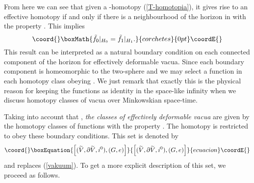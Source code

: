 \documentclass[a4paper,12pt,draft]{article}
\begin{document}
From here we can see that given a \coordHE{}-homotopy (\ref{T-homotopia}), it
gives rise to an effective homotopy if and only if there is a
neighbourhood \coordHE{} of the horizon in \coordHE{} with the
property \coordHE{}. This implies
\[\coord{}\boxMath{\tilde{f}_0\vert_{H_0}=\tilde{f}_1\vert_{H_1}.}{corchetes}{0pt}\coordE{}\]
This result can be interpreted as a natural boundary condition on each
connected component of the horizon for effectively deformable vacua.
Since each boundary component is homeomorphic to the two-sphere \coordHE{}
and \coordHE{} we may select a function in each homotopy class
obeying \coordHE{}.
We just remark that exactly this is the physical reason for keeping the
functions as identity in the space-like infinity \coordHE{} when we discuss
homotopy classes of vacua over Minkowskian space-time.

Taking into account that \coordHE{}, {\it the classes 
of effectively deformable vacua} are given by the homotopy classes of
functions \coordHE{} with the property
\coordHE{}. The homotopy is
restricted to obey these boundary conditions. This set is denoted by
\begin{equation}\coord{}\boxEquation{
\left[ (\widetilde{V}, \partial\widetilde{V}, i^0), (G,
e)\right]
\label{ujvakuum}
}{
\left[ (\widetilde{V}, \partial\widetilde{V}, i^0), (G,
e)\right]
}{ecuacion}\coordE{}\end{equation}
and replaces (\ref{vakuum}). To get a more explicit description of
this set, we proceed as follows.
\end{document}
